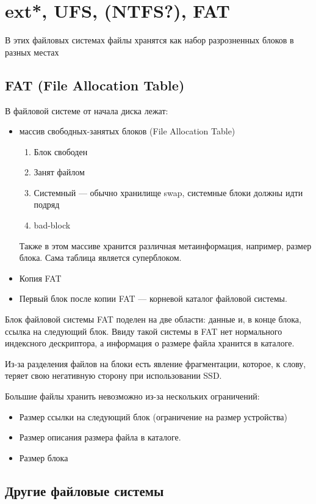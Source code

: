 \newpage
\section{ext*, UFS, (NTFS?), FAT}

В этих файловых системах файлы хранятся как набор разрозненных блоков в разных местах

\subsection{FAT (File Allocation Table)}

В файловой системе от начала диска лежат:

\begin{itemize}
\item массив свободных-занятых блоков (File Allocation Table)
\begin{enumerate}
\item Блок свободен
\item Занят файлом
\item Системный --- обычно хранилище swap, системные блоки должны идти подряд
\item bad-block
\end{enumerate}
Также в этом массиве хранится различная метаинформация, например, размер блока. Сама таблица является суперблоком.
\item Копия FAT
\item Первый блок после копии FAT --- корневой каталог файловой системы.
\end{itemize}

Блок файловой системы FAT поделен на две области: данные и, в конце блока, ссылка на следующий блок. Ввиду такой системы в FAT нет нормального индексного дескриптора, а информация о размере файла хранится в каталоге.

Из-за разделения файлов на блоки есть явление фрагментации, которое, к слову, теряет свою негативную сторону при использовании SSD.

Большие файлы хранить невозможно из-за нескольких ограничений:
\begin{itemize}
\item Размер ссылки на следующий блок (ограничение на размер устройства)
\item Размер описания размера файла в каталоге.
\item Размер блока
\end{itemize}

\subsection{Другие файловые системы}

